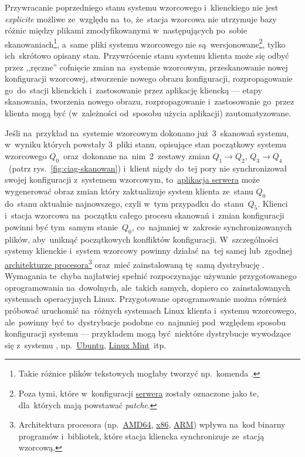 \documentclass[thesis]{subfiles}
\begin{document}
Przywracanie poprzedniego stanu systemu wzorcowego i~klienckiego nie jest \emph{explicite} możliwe ze~względu na~to, że~stacja wzorcowa nie utrzymuje bazy różnic między plikami zmodyfikowanymi w~następujących po~sobie skanowaniach\footnote{Takie różnice plików tekstowych mogłaby tworzyć np.~komenda .}, a~same pliki systemu wzorcowego nie są~wersjonowane\footnote{Poza tymi, które w~konfiguracji \hyperref[sec:srv-app]{serwera} zostały oznaczone jako te, dla~których mają powstawać \emph{patche}.}, tylko ich~skrótowo opisany stan. Przywrócenie stanu systemu klienta może się odbyć przez ,,ręczne'' cofnięcie zmian na~systemie wzorcowym, przeskanowanie nowej konfiguracji wzorcowej, stworzenie nowego obrazu konfiguracji, rozpropagowanie go~do~stacji klienckich i~zastosowanie przez aplikację kliencką --- etapy skanowania, tworzenia nowego obrazu, rozpropagowanie i~zastosowanie go~przez klienta mogą być (w~zależności od~sposobu użycia aplikacji) zautomatyzowane.

Jeśli na~przykład na~systemie wzorcowym dokonano już~3~skanowań systemu, w~wyniku których powstały 3~pliki stanu, opisujące stan początkowy systemu wzorcowego $Q_0$~oraz~dokonane na~nim~2~zestawy zmian $Q_1\rightarrow Q_2$, $Q_3\rightarrow Q_4$~(patrz rys.~\ref{fig:ciag-skanowan}) i~klient nigdy do~tej pory nie synchronizował swojej konfiguracji z~systemem wzorcowym, to~\hyperref[sec:srv-app]{aplikacja serwera} może wygenerować obraz zmian który zaktualizuje system klienta ze~stanu $Q_0$ do~stanu aktualnie najnowszego, czyli w~tym przypadku do~stanu~$Q_5$. Klienci i~stacja wzorcowa na~początku całego procesu skanowań i~zmian konfiguracji powinni być tym~samym stanie~$Q_0$, co~najmniej w~zakresie synchronizowanych plików, aby~uniknąć początkowych konfliktów konfiguracji. W~szczególności systemy klienckie i~system wzorcowy powinny działać na~tej samej lub~zgodnej \href{https://en.wikipedia.org/wiki/List_of_instruction_sets}{architekturze procesora}\footnote{Architektura procesora (np.~\href{https://en.wikipedia.org/wiki/X86-64}{AMD64}, \href{https://en.wikipedia.org/wiki/X86}{x86}, \href{https://en.wikipedia.org/wiki/ARM_architecture}{ARM}) wpływa na~kod binarny programów i~bibliotek, które stacja kliencka synchronizuje ze~stacją wzorcową.} oraz~mieć zainstalowaną tę~samą dystrybucję . Wymagania te~chyba najłatwiej spełnić rozpoczynając używanie przygotowanego oprogramowania na~dowolnych, ale~takich samych, dopiero co~zainstalowanych systemach operacyjnych Linux. Przygotowane oprogramowanie można również próbować uruchomić na~różnych systemach Linux klienta i~systemu wzorcowego, ale~powinny być to~dystrybucje podobne co~najmniej pod~względem sposobu konfiguracji systemu --- przykładem mogą być~niektóre dystrybucje wywodzące się z~systemu \debian{}, np.~\href{https://en.wikipedia.org/wiki/Ubuntu_(operating_system)}{Ubuntu}, \href{https://en.wikipedia.org/wiki/Linux_Mint}{Linux Mint}~itp.
\end{document}

